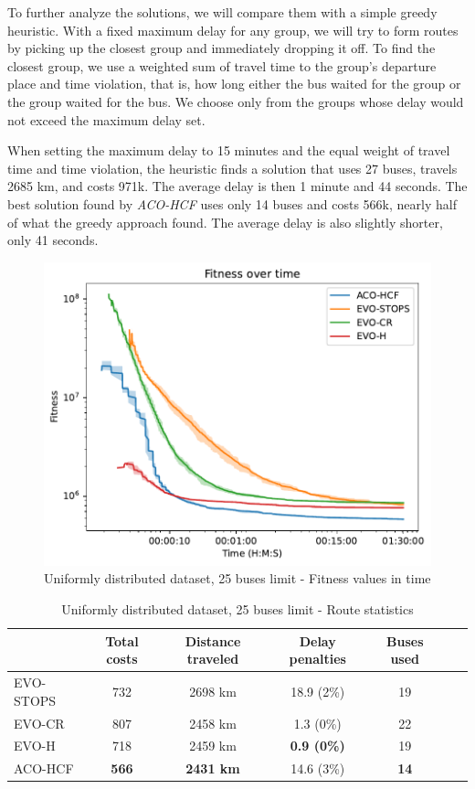 \label{experiments-greedy}To further analyze the solutions, we will compare them with a simple greedy heuristic. With a fixed maximum delay for any group, we will try to form routes by picking up the closest group and immediately dropping it off. To find the closest group, we use a weighted sum of travel time to the group's departure place and time violation, that is, how long either the bus waited for the group or the group waited for the bus. We choose only from the groups whose delay would not exceed the maximum delay set.

When setting the maximum delay to 15 minutes and the equal weight of travel time and time violation, the heuristic finds a solution that uses 27 buses, travels 2685 km, and costs 971k. The average delay is then 1 minute and 44 seconds. The best solution found by \textit{ACO-HCF} uses only 14 buses and costs 566k, nearly half of what the greedy approach found. The average delay is also slightly shorter, only 41 seconds.

\clearpage

\begin{figure}
    \centering
    \includegraphics[width=1\linewidth]
    {img/exp_random_25b_100_time.pdf}
    \caption{Uniformly distributed dataset, 25 buses limit - Fitness values in time}
    \label{fig:exp_random_25}
\end{figure}

\begin{table}
    \centering
    \begin{tabular}{lcccccc}
         & Total costs & Distance traveled & Delay penalties & Buses used \\
         \hline
         EVO-STOPS & 732 & 2698 km & 18.9 (2\%) & 19 \\
         EVO-CR & 807 & 2458 km & 1.3 (0\%) & 22 \\
         EVO-H & 718 & 2459 km & \textbf{0.9 (0\%)} & 19 \\
         ACO-HCF & \textbf{566} & \textbf{2431 km} & 14.6 (3\%) & \textbf{14}
    \end{tabular}
    \caption{Uniformly distributed dataset, 25 buses limit - Route statistics}
    \label{tab:exp_random_25_route_stats}
\end{table}


